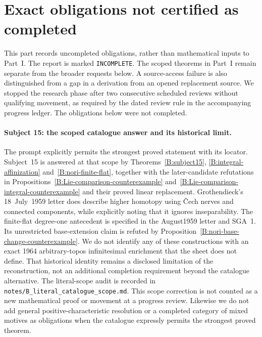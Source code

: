 \section{Exact obligations not certified as completed}

This part records uncompleted obligations, rather than mathematical inputs
to Part~I. The report is marked \texttt{INCOMPLETE}. The scoped theorems in
Part~I remain separate from the broader requests below. A source-access
failure is also distinguished from a gap in a derivation from an opened
replacement source. We stopped the research phase after two consecutive scheduled reviews
without qualifying movement, as required by the dated review rule in the
accompanying progress ledger. The obligations below were not completed.

\paragraph{Subject 15: the scoped catalogue answer and its historical limit.}
The prompt explicitly permits the strongest proved statement with its
locator. Subject~15 is answered at that scope by
Theorems~\ref{B:subject15}, \ref{B:integral-affinization}
and~\ref{B:nori-finite-flat}, together with the later-candidate
refutations in Propositions~\ref{B:Lie-comparison-counterexample}
and~\ref{B:Lie-comparison-integral-counterexample} and their proved
linear replacement. Grothendieck's 18~July~1959 letter does describe
higher homotopy using \v Cech nerves and connected components, while
explicitly noting that it ignores inseparability. The finite-flat
degree-one antecedent is specified in the August1959 letter and
SGA~1. Its unrestricted base-extension claim is refuted by
Proposition~\ref{B:nori-base-change-counterexample}.
We do not identify any of these constructions with an exact
1964 arbitrary-topos infinitesimal enrichment that the sheet does not
define. That historical identity remains a disclosed limitation of the
reconstruction, not an additional completion requirement beyond the
catalogue alternative. The literal-scope audit is recorded in
\texttt{notes/B\_literal\_catalogue\_scope.md}. This scope correction
is not counted as a new mathematical proof or movement at a progress
review. Likewise we do not add general positive-characteristic
resolution or a completed category of mixed motives as obligations
when the catalogue expressly permits the strongest proved theorem.

